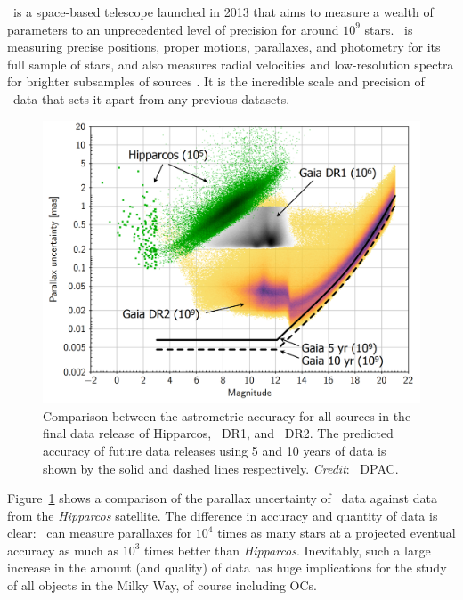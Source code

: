 \gaia\ is a space-based telescope launched in 2013 that aims to measure a wealth of parameters to an unprecedented level of precision for around $10^9$ stars. \gaia\ is measuring precise positions, proper motions, parallaxes, and photometry for its full sample of stars, and also measures radial velocities and low-resolution spectra for brighter subsamples of sources \citep{gaia_collaboration_gaia_2016}. It is the incredible scale and precision of \gaia\ data that sets it apart from any previous datasets.

\begin{figure}[tb]
	\includegraphics[width=\textwidth]{fig/c1/gaia_dr2_astrometry.png}
	\caption[Comparison between the astrometric accuracy for Hipparcos, Gaia, and future Gaia data releases]{Comparison between the astrometric accuracy for all sources in the final data release of Hipparcos, \gaia\ DR1, and \gaia\ DR2. The predicted accuracy of future data releases using 5 and 10 years of data is shown by the solid and dashed lines respectively. \emph{Credit}: \gaia\ DPAC.}
	\label{fig:intro:history:gaia_accuracy}
\end{figure}

Figure~\ref{fig:intro:history:gaia_accuracy} shows a comparison of the parallax uncertainty of \gaia\ data against data from the \emph{Hipparcos} satellite. The difference in accuracy and quantity of data is clear: \gaia\ can measure parallaxes for $10^4$ times as many stars at a projected eventual accuracy as much as $10^3$ times better than \emph{Hipparcos}. Inevitably, such a large increase in the amount (and quality) of data has huge implications for the study of all objects in the Milky Way, of course including OCs.

